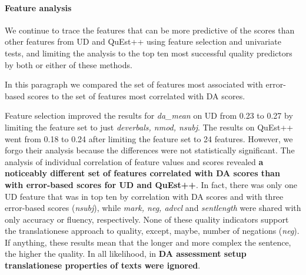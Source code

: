 \paragraph{Feature analysis} 
We continue to trace the features that can be more predictive of the scores than other features from UD and QuEst++ using feature selection and univariate tests, and limiting the analysis to the top ten most successful quality predictors by both or either of these methods.

In this paragraph we compared the set of features most associated with error-based scores to the set of features most correlated with DA scores. 

Feature selection improved the results for \textit{da\_mean} on UD from 0.23 to 0.27 by limiting the feature set to just \textit{deverbals, nmod, nsubj}. The results on QuEst++ went from 0.18 to 0.24 after limiting the feature set to 24 features. However, we forgo their analysis because the differences were not statistically significant.
\label{pg:da_ignores_translationese_feats}
The analysis of individual correlation of feature values and scores revealed \textbf{a noticeably different set of features correlated with DA scores than with error-based scores for UD and QuEst++}. 
In fact, there was only one UD feature that was in top ten by correlation with DA scores and with three error-based scores (\textit{nsubj}), while \textit{mark, neg, advcl} and \textit{sentlength} were shared with only accuracy or fluency, respectively.
None of these quality indicators support the translationese approach to quality, except, maybe, number of negations (\textit{neg}). If anything, these results mean that the longer and more complex the sentence, the higher the quality. In all likelihood, in \textbf{DA assessment setup translationese properties of texts were ignored}.  


